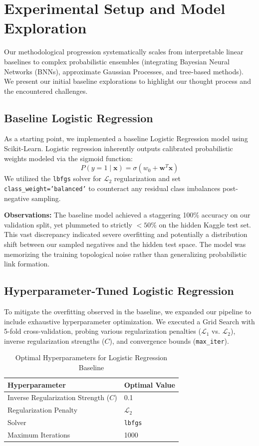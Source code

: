 \documentclass[11pt,a4paper]{article}
\begin{document}
\section{Experimental Setup and Model Exploration}
Our methodological progression systematically scales from interpretable linear baselines to complex probabilistic ensembles (integrating Bayesian Neural Networks (BNNs), approximate Gaussian Processes, and tree-based methods). We present our initial baseline explorations to highlight our thought process and the encountered challenges.

\subsection{Baseline Logistic Regression}
As a starting point, we implemented a baseline Logistic Regression model using Scikit-Learn. Logistic regression inherently outputs calibrated probabilistic weights modeled via the sigmoid function: 
$$ P(y=1 \mid \mathbf{x}) = \sigma(w_0 + \mathbf{w}^T\mathbf{x}) $$
We utilized the \texttt{lbfgs} solver for $\mathcal{L}_2$ regularization and set \texttt{class\_weight='balanced'} to counteract any residual class imbalances post-negative sampling. 

\textbf{Observations:} The baseline model achieved a staggering 100\% accuracy on our validation split, yet plummeted to strictly $<50\%$ on the hidden Kaggle test set. This vast discrepancy indicated severe overfitting and potentially a distribution shift between our sampled negatives and the hidden test space. The model was memorizing the training topological noise rather than generalizing probabilistic link formation.

\subsection{Hyperparameter-Tuned Logistic Regression}
To mitigate the overfitting observed in the baseline, we expanded our pipeline to include exhaustive hyperparameter optimization. We executed a Grid Search with 5-fold cross-validation, probing various regularization penalties ($\mathcal{L}_1$ vs. $\mathcal{L}_2$), inverse regularization strengths ($C$), and convergence bounds (\texttt{max\_iter}).

\begin{table}[H]
    \centering
    \caption{Optimal Hyperparameters for Logistic Regression Baseline}
    \vspace{0.5em}
    \begin{tabular}{ll}
        \toprule
        \textbf{Hyperparameter} & \textbf{Optimal Value} \\
        \midrule
        Inverse Regularization Strength ($C$) & 0.1 \\
        Regularization Penalty & $\mathcal{L}_2$ \\
        Solver & \texttt{lbfgs} \\
        Maximum Iterations & 1000 \\
        \bottomrule
    \end{tabular}
    \label{tab:hyperparams}
\end{table}
\end{document}
